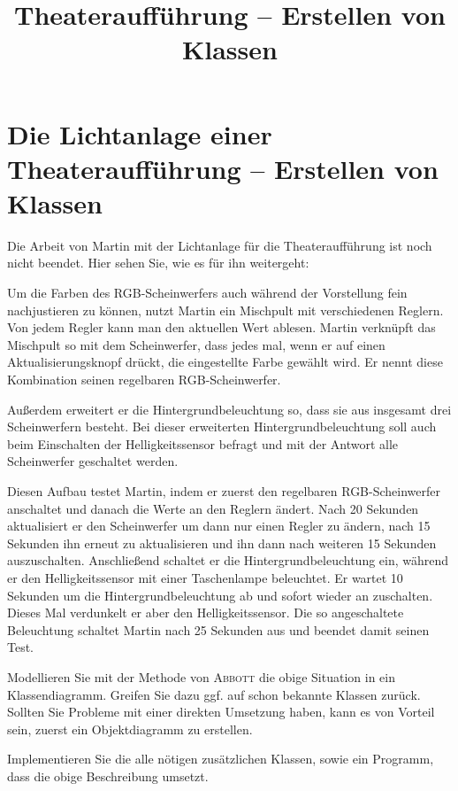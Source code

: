 \documentclass[11pt,a4paper,parskip=half]{scrartcl}
\title{Theateraufführung -- Erstellen von Klassen}
\begin{document}
\section*{Die Lichtanlage einer Theateraufführung -- Erstellen von Klassen}

Die Arbeit von Martin mit der Lichtanlage für die Theateraufführung ist noch nicht beendet. Hier sehen Sie, wie es für ihn weitergeht:

\begin{mdframed}
Um die Farben des RGB-Scheinwerfers auch während der Vorstellung fein nachjustieren zu können, nutzt Martin ein Mischpult mit verschiedenen Reglern. Von jedem Regler kann man den aktuellen Wert ablesen. Martin verknüpft das Mischpult so mit dem Scheinwerfer, dass jedes mal, wenn er auf einen Aktualisierungsknopf drückt, die eingestellte Farbe gewählt wird. Er nennt diese Kombination seinen regelbaren RGB-Scheinwerfer.

Außerdem erweitert er die Hintergrundbeleuchtung so, dass sie aus insgesamt drei Scheinwerfern besteht. Bei dieser erweiterten Hintergrundbeleuchtung soll auch beim Einschalten der Helligkeitssensor befragt und mit der Antwort alle Scheinwerfer geschaltet werden.

Diesen Aufbau testet Martin, indem er zuerst den regelbaren RGB-Scheinwerfer anschaltet und danach die Werte an den Reglern ändert. Nach 20 Sekunden aktualisiert er den Scheinwerfer um dann nur einen Regler zu ändern, nach 15 Sekunden ihn erneut zu aktualisieren und ihn dann nach weiteren 15 Sekunden auszuschalten. Anschließend schaltet er die Hintergrundbeleuchtung ein, während er den Helligkeitssensor mit einer Taschenlampe beleuchtet. Er wartet 10 Sekunden um die Hintergrundbeleuchtung ab und sofort wieder an zuschalten. Dieses Mal verdunkelt er aber den Helligkeitssensor. Die so angeschaltete Beleuchtung schaltet Martin nach 25 Sekunden aus und beendet damit seinen Test.
\end{mdframed}

\begin{aufgabe}
	Modellieren Sie mit der Methode von \textsc{Abbott} die obige Situation in ein Klassendiagramm. Greifen Sie dazu ggf. auf schon bekannte Klassen zurück. Sollten Sie Probleme mit einer direkten Umsetzung haben, kann es von Vorteil sein, zuerst ein Objektdiagramm zu erstellen.
\end{aufgabe}
\begin{aufgabe}
	Implementieren Sie die alle nötigen zusätzlichen Klassen, sowie ein Programm, dass die obige Beschreibung umsetzt.
\end{aufgabe}
\end{document}
